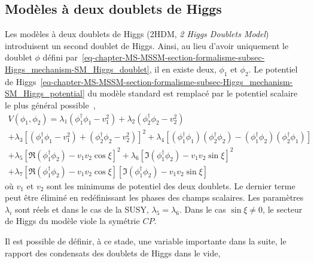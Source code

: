 \subsection{Modèles à deux doublets de Higgs}\label{chapter-MS-MSSM-section-BSM-subsec-dbl_H_dbl}
\par Les modèles à deux doublets de Higgs (2HDM, \emph{2 Higgs Doublets Model}) introduisent un second doublet de Higgs.
Ainsi, au lieu d'avoir uniquement le doublet $\phi$ défini par~\eqref{eq-chapter-MS-MSSM-section-formalisme-subsec-Higgs_mechanism-SM_Higgs_doublet}, il en existe deux, $\phi_1$ et $\phi_2$.
Le potentiel de Higgs~\eqref{eq-chapter-MS-MSSM-section-formalisme-subsec-Higgs_mechanism-SM_Higgs_potential} du modèle standard est remplacé par le potentiel scalaire le plus général possible~\cite{Higgs_hunter_guide,Higgs_hunter_guide_errata},
\begin{multline}
V(\phi_1,\phi_2)
= \lambda_1 (\phi_1^\dagger\phi_1-v_1^2)
+ \lambda_2 (\phi_2^\dagger\phi_2-v_2^2)
\\
+ \lambda_3 \left[ (\phi_1^\dagger\phi_1-v_1^2) + (\phi_2^\dagger\phi_2-v_2^2) \right]^2
+ \lambda_4 \left[ (\phi_1^\dagger\phi_1)(\phi_2^\dagger\phi_2) - (\phi_1^\dagger\phi_2)(\phi_2^\dagger\phi_1) \right]
\\
+ \lambda_5 \left[ \Re(\phi_1^\dagger\phi_2) -v_1v_2\cos\xi \right]^2
+ \lambda_6 \left[ \Im(\phi_1^\dagger\phi_2) -v_1v_2\sin\xi \right]^2
\\
+ \lambda_7 \left[ \Re(\phi_1^\dagger\phi_2) -v_1v_2\cos\xi \right]\left[ \Im(\phi_1^\dagger\phi_2) -v_1v_2\sin\xi \right]
\label{eq-chapter-MS-MSSM-section-BSM-subsec-dbl_H_dbl-Higgs_potential}
\end{multline}
où $v_1$ et $v_2$ sont les minimums de potentiel des deux doublets.
Le dernier terme peut être éliminé en redéfinissant les phases des champs scalaires.
Les paramètres $\lambda_i$ sont réels et dans le cas de la SUSY, $\lambda_5=\lambda_6$.
Dans le cas $\sin\xi\neq0$, le secteur de Higgs du modèle viole la symétrie $CP$.
\par Il est possible de définir, à ce stade, une variable importante dans la suite, le rapport des condensats des doublets de Higgs dans le vide,
